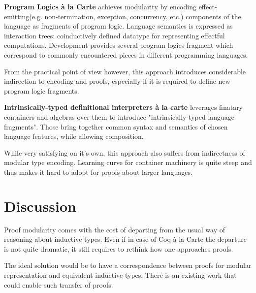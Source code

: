 \documentclass[sigplan,nonacm]{acmart}
\begin{document}
\medskip
\textbf{Program Logics à la Carte}\cite{vistrup2025program} achieves modularity by encoding effect-emitting(e.g. non-termination, exception, concurrency, etc.) components of the language as fragments of program logic. 
Language semantics is expressed as interaction trees\cite{xia2019interaction}: coinductively defined datatype for representing effectful computations. 
Development provides several program logics fragment which correspond to commonly encountered pieces in different programming languages. 

From the practical point of view however, this approach introduces considerable indirection to encoding and proofs, especially if it is required to define new program logic fragments.



\medskip
\textbf{Intrinsically-typed definitional interpreters {\`a} la carte}\cite{van2022intrinsically} leverages finatary containers\cite{altenkirch2015indexed} and algebras over them to introduce "intrinsically-typed language fragments".
Those bring together common syntax and semantics of chosen language features, while allowing composition. 

While very satisfying on it's own, this approach also suffers from indirectness of modular type encoding. Learning curve for container machinery is quite steep and thus makes it hard to adopt for proofs about larger languages.




\medskip

\section{Discussion}

Proof modularity comes with the cost of departing from the usual way of reasoning about inductive types. 
Even if in case of Coq à la Carte the departure is not quite dramatic, it still requires to rethink how one approaches proofs.

The ideal solution would be to have a correspondence between proofs for modular representation and equivalent inductive types. 
There is an existing work\cite{cohen2024trocq} that could enable such transfer of proofs. 

\end{document}
